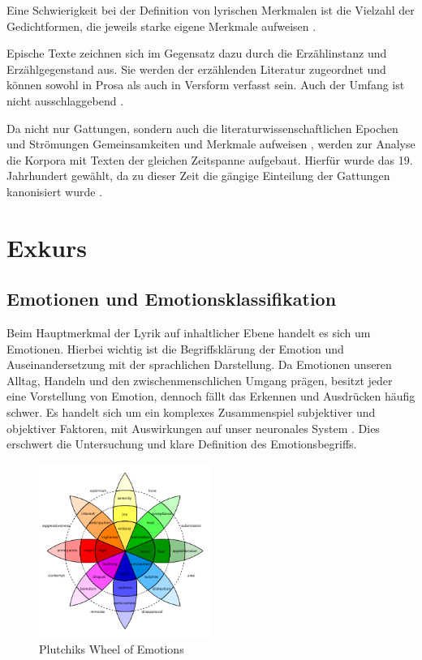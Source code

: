 \documentclass[a4paper,10p]{article}
\begin{document}
Eine Schwierigkeit bei der Definition von lyrischen Merkmalen ist die Vielzahl der Gedichtformen, die jeweils starke eigene Merkmale aufweisen \citep[vgl.][S. 119]{Krah2006}. \par 

Epische Texte zeichnen sich im Gegensatz dazu durch die Erzählinstanz und Erzählgegenstand aus. Sie werden der erzählenden Literatur zugeordnet und können sowohl in Prosa als auch in Versform verfasst sein. Auch der Umfang ist nicht ausschlaggebend \citep[vgl.][S. 195]{SchweikleGunther;Burdorf2007}. \par 

Da nicht nur Gattungen, sondern auch die literaturwissenschaftlichen Epochen und Strömungen Gemeinsamkeiten und Merkmale aufweisen \citep[vgl.][S. 274]{Krah2006}, werden zur Analyse die Korpora mit Texten der gleichen Zeitspanne aufgebaut. Hierfür wurde das 19. Jahrhundert gewählt, da zu dieser Zeit die gängige Einteilung der Gattungen kanonisiert wurde \citep[vgl.][S. 368]{Krah2006}.


\section{Exkurs}
\subsection{Emotionen und Emotionsklassifikation}
Beim Hauptmerkmal der Lyrik auf inhaltlicher Ebene handelt es sich um Emotionen. Hierbei wichtig ist die Begriffsklärung der Emotion und Auseinandersetzung mit der sprachlichen Darstellung. Da Emotionen unseren Alltag, Handeln und den zwischenmenschlichen Umgang prägen, besitzt jeder eine Vorstellung von Emotion, dennoch fällt das Erkennen und Ausdrücken häufig schwer. Es handelt sich um ein komplexes Zusammenspiel subjektiver und objektiver Faktoren, mit Auswirkungen auf unser neuronales System \citep[vgl.][S. 355]{KleinginnaPaulR;Kleinginna1981}. Dies erschwert die Untersuchung und klare Definition des Emotionsbegriffs. \par 

\begin{figure}
	\includegraphics[width=0.5\textwidth]{plutchik_wheel.png}
	\caption{Plutchiks Wheel of Emotions}
	\label{Wheel}
\end{figure}
\end{document}
